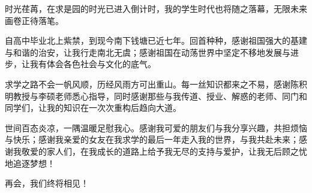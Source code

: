 \cleardoublepage
{}

时光荏苒，在求是园的时光已进入倒计时，我的学生时代也将随之落幕，无限未来画卷正待落笔。

自高中毕业北上紫禁，到现今南下钱塘已近七年。回首种种，感谢祖国强大的基建与和谐的治安，让我行走南北无虞；感谢祖国在动荡世界中坚定不移地发展与进步，让我有体会各色社会与文化的底气。

求学之路不会一帆风顺，历经风雨方可出重山。每一丝知识都来之不易，感谢陈积明教授与李硕老师悉心指导，同时感谢那些与我传道、授业、解惑的老师、同门和同学们，让我的知识在一次次重构后趋向大道。

世间百态炎凉，一隅温暖足慰我心。感谢我可爱的朋友们与我分享兴趣，共担烦恼与快乐；感谢我亲爱的女友在我求学的最后一年走入我的世界，与我共赴未来；感谢我敬爱的家人们，在我成长的道路上给予我无尽的支持与爱护，让我无后顾之忧地追逐梦想！

再会，我们终将相见！